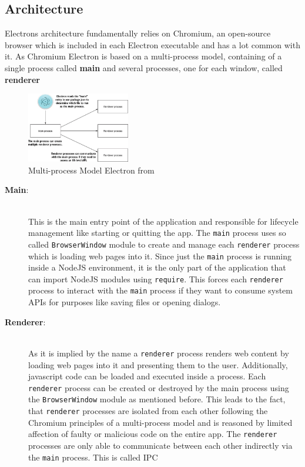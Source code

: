 \subsection{Architecture}
\label{subsec:electron:architecture}
Electrons architecture fundamentally relies on Chromium, an open-source browser which is included in each Electron executable and has a lot common with it.
As Chromium Electron is based on a multi-process model, containing of a single process called \textbf{main} and several processes, one for each window, called \textbf{renderer}
\begin{figure}[ht]
    \label{fig:electron:model}
    \centering
    \includegraphics[width=0.4\textwidth]{images/electron-model}
    \caption[Bla]{Multi-process Model Electron from~\cite[Fig. 1.7]{electron-in-action}}
\end{figure}
\begin{description}
    \item[\textbf{Main}:] \hfill \\ This is the main entry point of the application and responsible for lifecycle management like starting or quitting the app.
    The \texttt{main} process uses so called \texttt{BrowserWindow} module to create and manage each \texttt{renderer} process which is loading web pages into it.
    Since just the \texttt{main} process is running inside a NodeJS environment, it is the only part of the application that can import NodeJS modules using \texttt{require}.
    This forces each \texttt{renderer} process to interact with the \texttt{main} process if they want to consume system \ac{API}s for purposes like saving files or opening dialogs.
    \item[\textbf{Renderer}:] \hfill \\ As it is implied by the name a \texttt{renderer} process renders web content by loading web pages into it and presenting them to the user.
    Additionally, javascript code can be loaded and executed inside a process.
    Each \texttt{renderer} process can be created or destroyed by the main process using the \texttt{BrowserWindow} module as mentioned before.
    This leads to the fact, that \texttt{renderer} processes are isolated from each other following the Chromium principles of a multi-process model and is reasoned by limited affection of
    faulty or malicious code on the entire app.
    The \texttt{renderer} processes are only able to communicate between each other indirectly via the \texttt{main} process.
    This is called \ac{IPC}
\end{description}

